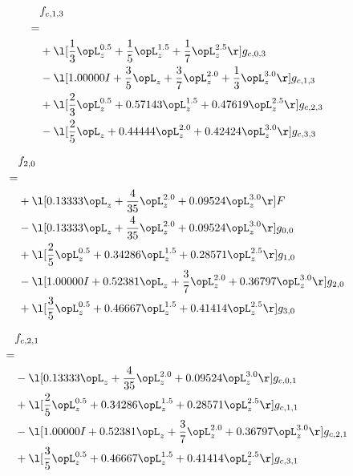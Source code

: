 \begin{alignat}{2} 
\label{eq:f_13_0} 
& f_{c,1,3} \nonumber \\ 
 = \\ 
& + \l[ \frac{1}{3} \opL_z^{0.5} + \frac{1}{5} \opL_z^{1.5} + \frac{1}{7} \opL_z^{2.5}  \r] g_{c,0,3} \nonumber \\ 
& - \l[  1.00000 I + \frac{3}{5} \opL_z + \frac{3}{7} \opL_z^{2.0} + \frac{1}{3} \opL_z^{3.0}  \r] g_{c,1,3} \nonumber \\ 
& + \l[ \frac{2}{3} \opL_z^{0.5} +  0.57143 \opL_z^{1.5} +  0.47619 \opL_z^{2.5}  \r] g_{c,2,3} \nonumber \\ 
& - \l[ \frac{2}{5} \opL_z +  0.44444 \opL_z^{2.0} +  0.42424 \opL_z^{3.0}  \r] g_{c,3,3} \nonumber \\ 
\end{alignat} 


\begin{alignat}{2} 
\label{eq:f_20_0} 
& f_{2,0} \nonumber \\ 
 = \\ 
& + \l[  0.13333 \opL_z + \frac{4}{35} \opL_z^{2.0} +  0.09524 \opL_z^{3.0}  \r] F \nonumber \\ 
& - \l[  0.13333 \opL_z + \frac{4}{35} \opL_z^{2.0} +  0.09524 \opL_z^{3.0}  \r] g_{0,0} \nonumber \\ 
& + \l[ \frac{2}{5} \opL_z^{0.5} +  0.34286 \opL_z^{1.5} +  0.28571 \opL_z^{2.5}  \r] g_{1,0} \nonumber \\ 
& - \l[  1.00000 I +  0.52381 \opL_z + \frac{3}{7} \opL_z^{2.0} +  0.36797 \opL_z^{3.0}  \r] g_{2,0} \nonumber \\ 
& + \l[ \frac{3}{5} \opL_z^{0.5} +  0.46667 \opL_z^{1.5} +  0.41414 \opL_z^{2.5}  \r] g_{3,0} \nonumber \\ 
\end{alignat} 


\begin{alignat}{2} 
\label{eq:f_21_0} 
& f_{c,2,1} \nonumber \\ 
 = \\ 
& - \l[  0.13333 \opL_z + \frac{4}{35} \opL_z^{2.0} +  0.09524 \opL_z^{3.0}  \r] g_{c,0,1} \nonumber \\ 
& + \l[ \frac{2}{5} \opL_z^{0.5} +  0.34286 \opL_z^{1.5} +  0.28571 \opL_z^{2.5}  \r] g_{c,1,1} \nonumber \\ 
& - \l[  1.00000 I +  0.52381 \opL_z + \frac{3}{7} \opL_z^{2.0} +  0.36797 \opL_z^{3.0}  \r] g_{c,2,1} \nonumber \\ 
& + \l[ \frac{3}{5} \opL_z^{0.5} +  0.46667 \opL_z^{1.5} +  0.41414 \opL_z^{2.5}  \r] g_{c,3,1} \nonumber \\ 
\end{alignat} 


